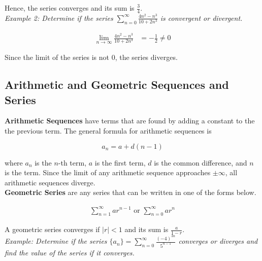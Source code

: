         \noindent Hence, the series converges and its sum is $\frac{3}{4}$. \\

        \noindent \color{blue} \textit{Example 2: Determine if the series $\sum^\infty_{n=0}
        \frac{4n^2-n^3}{10+2n^3}$ is convergent or divergent.} \color{black}

        \begin{align*}
            \lim_{n\rightarrow\infty} \frac{4n^2-n^3}{10+2n^3} &= -\frac{1}{2} \not =0
        \end{align*}

        \noindent Since the limit of the series is not 0, the series diverges.

    \subsection{Arithmetic and Geometric Sequences and Series}
        \color{purple} \textbf{Arithmetic Sequences} \color{black} have terms that are found by
        adding a constant to the the previous term. The general formula for arithmetic sequences
        is

        \begin{equation*}
            a_n = a + d(n-1)
        \end{equation*}

        \noindent where $a_n$ is the $n$-th term, $a$ is the first term, $d$ is the common
        difference, and $n$ is the term. Since the limit of any arithmetic sequence approaches
        $\pm\infty$, all arithmetic sequences diverge. \\

        \noindent \color{purple} \textbf{Geometric Series} \color{black} are any series that
        can be written in one of the forms below.

        \begin{align*}
            \sum^\infty_{n=1} ar^{n-1} \text{ or } \sum^\infty_{n=0} ar^n
        \end{align*}

        \noindent A geometric series converges if $|r|<1$ and its sum is $\frac{a}{1-r}$. \\

        \pagebreak
        \noindent \color{blue} \textit{Example: Determine if the series $\{a_n\}=\sum^\infty_{n=0}
        \frac{(-4)^{3n}}{5^{n-1}}$ converges or diverges and find the value of the series if
        it converges.} \color{black} \\

